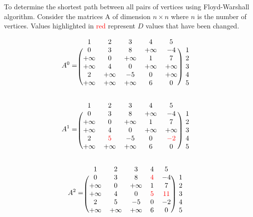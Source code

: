 \documentclass{article}
\begin{document}
To determine the shortest path between all pairs of vertices using Floyd-Warshall algorithm. Consider the matrices A of dimension $n \times n$ where $n$ is the number of vertices. Values highlighted in \textcolor{red}{red} represent $D$ values that have been changed.

\begin{equation*}
A^0=
    \begin{blockarray}{c c c c c c}
        1 & 2 & 3 & 4 & 5 \\
        \begin{block}{(c c c c c)c}
            0 & 3 & 8 & +\infty & -4 & 1 \\
            +\infty & 0 & +\infty & 1 & 7 & 2 \\
            +\infty & 4 & 0 & +\infty & +\infty & 3 \\
            2 & +\infty & -5 & 0 & +\infty & 4 \\
            +\infty & +\infty & +\infty & 6 & 0 & 5 \\
        \end{block}
    \end{blockarray}
\end{equation*}

\begin{equation*}
A^1=
    \begin{blockarray}{c c c c c c}
        1 & 2 & 3 & 4 & 5 \\
        \begin{block}{(c c c c c)c}
            0 & 3 & 8 & +\infty & -4 & 1 \\
            +\infty & 0 & +\infty & 1 & 7 & 2 \\
            +\infty & 4 & 0 & +\infty & +\infty & 3 \\
            2 & \textcolor{red}{5} & -5 & 0 & \textcolor{red}{-2} & 4 \\
            +\infty & +\infty & +\infty & 6 & 0 & 5 \\
        \end{block}
    \end{blockarray}
\end{equation*}

\begin{equation*}
A^2=
    \begin{blockarray}{c c c c c c}
        1 & 2 & 3 & 4 & 5 \\
        \begin{block}{(c c c c c)c}
            0 & 3 & 8 & \textcolor{red}{4} & -4 & 1 \\
            +\infty & 0 & +\infty & 1 & 7 & 2 \\
            +\infty & 4 & 0 & \textcolor{red}{5} & \textcolor{red}{11} & 3 \\
            2 & 5 & -5 & 0 & -2 & 4 \\
            +\infty & +\infty & +\infty & 6 & 0 & 5 \\
        \end{block}
    \end{blockarray}
\end{equation*}
\end{document}
